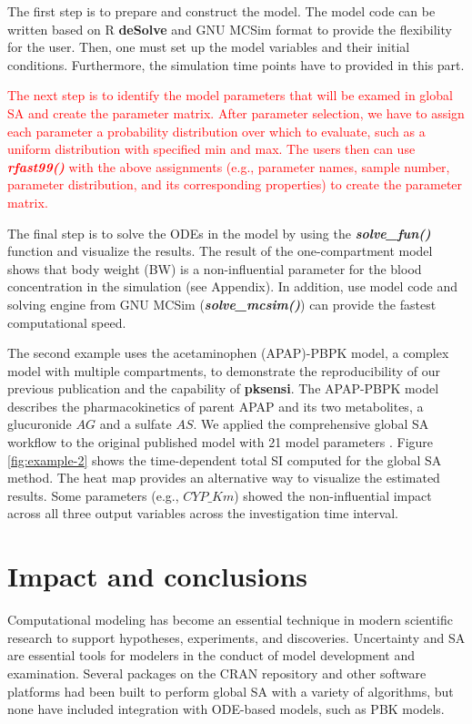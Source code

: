 \documentclass[preprint,12pt, a4paper]{elsarticle}
\begin{document}
The first step is to prepare and construct the model. The model code can be written based on R \textbf{deSolve} and GNU MCSim format to provide the flexibility for the user. Then, one must set up the model variables and their initial conditions. Furthermore, the simulation time points have to provided in this part.

\textcolor{red}{The next step is to identify the model parameters that will be examed in global SA and create the parameter matrix. After parameter selection, we have to assign each parameter a probability distribution over which to evaluate, such as a uniform distribution with specified min and max. The users then can use \textit{\textbf{rfast99()}} with the above assignments (e.g., parameter names, sample number, parameter distribution, and its corresponding properties) to create the parameter matrix.}

The final step is to solve the ODEs in the model by using the \textit{\textbf{solve\_fun()}} function and visualize the results. The result of the one-compartment model shows that body weight (BW) is a non-influential parameter for the blood concentration in the simulation (see Appendix). In addition, use model code and solving engine from GNU MCSim (\textit{\textbf{solve\_mcsim()}}) can provide the fastest computational speed.

The second example uses the acetaminophen (APAP)-PBPK model, 
a complex model with multiple compartments, to demonstrate the reproducibility of our previous publication \cite{fphar201800588} and the capability of \textbf{pksensi}. The APAP-PBPK model describes the pharmacokinetics of parent APAP and its two metabolites, a glucuronide \(AG\) and a sulfate \(AS\). We applied the comprehensive global SA workflow to the original published model with 21 model parameters \cite{s13318-015-0253-x}. Figure \ref{fig:example-2} shows the time-dependent total SI computed for the global SA method. The heat map provides an alternative way to visualize the estimated results. Some parameters (e.g., \(CYP\_Km\)) showed the non-influential impact across all three output variables across the investigation time interval.


\section{Impact and conclusions}

Computational modeling has become an essential technique in modern scientific research to support hypotheses, experiments, and discoveries. Uncertainty and SA are essential tools for modelers in the conduct of model development and examination. Several packages on the CRAN repository and other software platforms had been built to perform global SA with a variety of algorithms, but none have included integration with ODE-based models, such as PBK models. 
\end{document}
